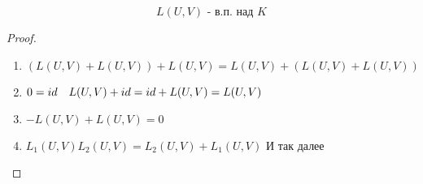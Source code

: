 \documentclass[algebra]{subfiles}
\begin{document}
    \begin{Theorem}
        \[L(U, V) \text{ - в.п. над } K\]
    \end{Theorem}

    \begin{proof}
        \begin{enumerate}
          \item $(L(U, V) + L(U, V)) + L(U, V) = L(U, V) + (L(U,V) + L(U,V))$
          \item $0 = id \quad L(U,V) + id = id + L(U,V) = L(U,V)$
          \item $-L(U,V) + L(U,V) = 0$
          \item $L_1(U,V) L_2(U,V) = L_2(U,V) + L_1(U,V)$
          И так далее
        \end{enumerate}
    \end{proof}
\end{document}
